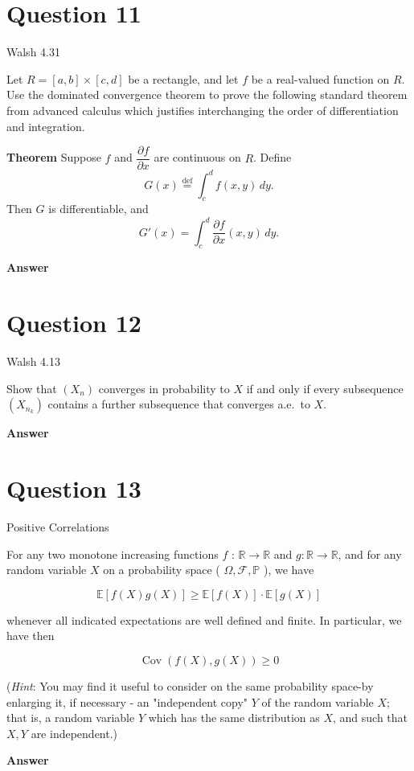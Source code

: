 \documentclass[letterpaper]{article}
\begin{document}
		\section{Question 11}
		
		{\color{deepred} Walsh 4.31} 
		
		Let $R = [a,b] \times [c,d]$ be a rectangle, and let $f$ be a real-valued function on $R$. Use the dominated convergence theorem to prove the following standard theorem from advanced calculus which justifies interchanging the order of differentiation and integration.
		
		\medskip
		
		\textbf{Theorem} Suppose $f$ and $\dfrac{\partial f}{\partial x}$ are continuous on $R$. Define
		\[
		G(x) \stackrel{\mathrm{def}}{=} \int_c^d f(x,y)\,dy.
		\]
		Then $G$ is differentiable, and
		\[
		G'(x) = \int_c^d \frac{\partial f}{\partial x}(x,y)\,dy.
		\]
		
		\textbf{Answer}
		
		\clearpage
		
		\section{Question 12}
		
		{\color{deepred} Walsh 4.13} 
		
		Show that $(X_n)$ converges in probability to $X$ if and only if every subsequence $(X_{n_k})$ contains a further subsequence that converges a.e.\ to $X$.
		
		\textbf{Answer}
		
		\clearpage
		
		\section{Question 13}
		
		{\color{deepred} Positive Correlations}
		
		For any two monotone increasing functions $f$ : $\mathbb{R} \rightarrow \mathbb{R}$ and $g: \mathbb{R} \rightarrow \mathbb{R}$, and for any random variable $X$ on a probability space ( $\Omega, \mathcal{F}, \mathbb{P}$ ), we have
		
		$$
		\mathbb{E}[f(X) g(X)] \geq \mathbb{E}[f(X)] \cdot \mathbb{E}[g(X)]
		$$
		
		whenever all indicated expectations are well defined and finite. In particular, we have then
		
		$$
		\operatorname{Cov}(f(X), g(X)) \geq 0
		$$
		
		(\emph{Hint}: You may find it useful to consider on the same probability space-by enlarging it, if necessary - an "independent copy" $Y$ of the random variable $X$; that is, a random variable $Y$ which has the same distribution as $X$, and such that $X, Y$ are independent.)
		
		
		
		\textbf{Answer}
		
		\clearpage
		
		
	
\end{document}

